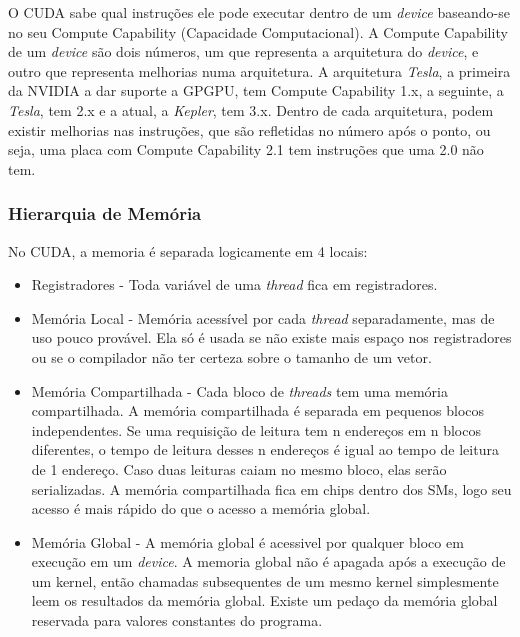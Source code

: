O CUDA sabe qual instruções ele pode executar dentro de um \textit{device} baseando-se no seu Compute Capability 
(Capacidade Computacional). A Compute Capability de um \textit{device} são dois números, um que representa a arquitetura do 
\textit{device}, e outro que representa melhorias numa arquitetura.
A arquitetura \textit{Tesla}, a primeira da NVIDIA a dar suporte a GPGPU, tem Compute Capability 1.x, a seguinte, a \textit{Tesla},
tem 2.x e a atual, a \textit{Kepler}, tem 3.x. Dentro de cada arquitetura, podem existir melhorias nas instruções, que são
refletidas no número após o ponto, ou seja, uma placa com Compute Capability 2.1 tem instruções que uma 2.0 não tem.

\subsubsection{Hierarquia de Memória}
No CUDA, a memoria é separada logicamente em 4 locais:

\begin{itemize}
  \item Registradores - Toda variável de uma \textit{thread} fica em registradores.
  \item Memória Local - Memória acessível por cada \textit{thread} separadamente, mas de uso pouco provável. Ela só é usada se
          não existe mais espaço nos registradores ou se o compilador não ter certeza sobre o tamanho de um vetor.
  \item Memória Compartilhada - Cada bloco de \textit{threads} tem uma memória compartilhada. A memória compartilhada é separada em
          pequenos blocos independentes. Se uma requisição de leitura tem n endereços em n blocos diferentes, o tempo de leitura
          desses n endereços é igual ao tempo de leitura de 1 endereço. Caso duas leituras caiam no mesmo bloco, elas serão
          serializadas. A memória compartilhada fica em chips dentro dos SMs, logo seu acesso é mais rápido do que o acesso a
          memória global.
  \item Memória Global - A memória global é acessivel por qualquer bloco em execução em um \textit{device}. A memoria global não é
          apagada após a execução de um kernel, então chamadas subsequentes de um mesmo kernel simplesmente leem os resultados
          da memória global. Existe um pedaço da memória global reservada para valores constantes do programa.
\end{itemize}

